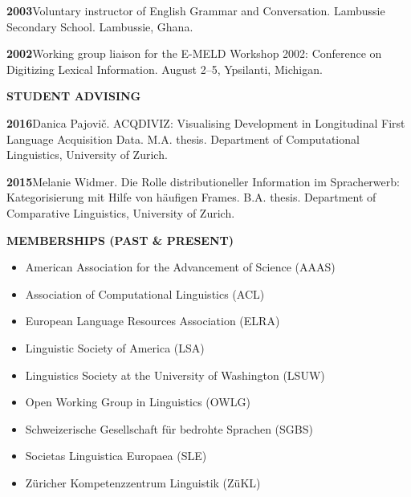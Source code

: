 \documentclass[11pt]{article}
\newcommand{\hangpara}{
 \setlength{\parindent}{0in} %
 \hangindent=0.42in %
}
\begin{document}
\vskip 6pt
\hangpara
{\bf 2003}\hspace{1ex}Voluntary instructor of English Grammar and Conversation. Lambussie Secondary School. Lambussie, Ghana.

\vskip 6pt
\hangpara
{\bf 2002}\hspace{1ex}Working group liaison for the E-MELD Workshop 2002: Conference on Digitizing Lexical Information. August 2--5, Ypsilanti, Michigan.

\newpage

\vskip 20pt
\begin{flushleft}
{\bf STUDENT ADVISING}
\end{flushleft}
\hangpara
{\bf 2016}\hspace{1ex}Danica Pajovi{\v c}. ACQDIVIZ: Visualising Development in Longitudinal First Language Acquisition Data. M.A. thesis. Department of Computational Linguistics, University of Zurich.

\vskip 6pt
\hangpara
{\bf 2015}\hspace{1ex}Melanie Widmer. Die Rolle distributioneller Information im Spracherwerb: Kategorisierung mit Hilfe von h{\"a}ufigen Frames. B.A. thesis. Department of Comparative Linguistics, University of Zurich.


\vskip 10pt
\begin{flushleft}
{\bf MEMBERSHIPS (PAST \& PRESENT)}
\end{flushleft}
\begin{itemize}
\item American Association for the Advancement of Science (AAAS)
\item Association of Computational Linguistics (ACL)
\item European Language Resources Association (ELRA)
\item Linguistic Society of America (LSA)
\item Linguistics Society at the University of Washington (LSUW)
\item Open Working Group in Linguistics (OWLG)
\item Schweizerische Gesellschaft f{\"u}r bedrohte Sprachen (SGBS)
\item Societas Linguistica Europaea (SLE)
\item Z{\"u}richer Kompetenzzentrum Linguistik (Z{\"u}KL)
\end{itemize}
\end{document}
